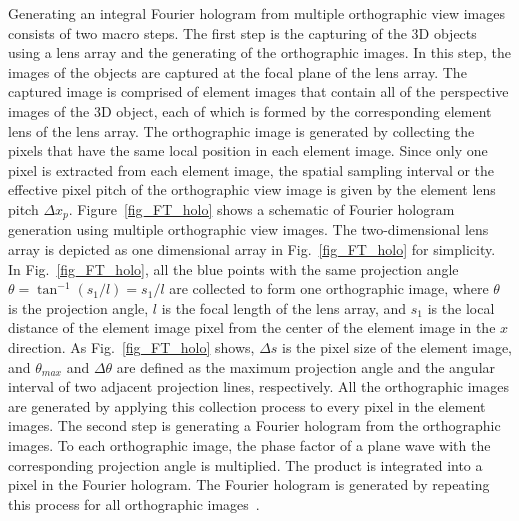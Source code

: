 \documentclass[10pt,letterpaper]{article}
\begin{document}
Generating an integral Fourier hologram from multiple orthographic view images consists of two macro steps. The first step is the capturing of the 3D objects using a lens array and the generating of the orthographic images. In this step, the images of the objects are captured at the focal plane of the lens array. The captured image is comprised of element images that contain all of the perspective images of the 3D object, each of which is formed by the corresponding element lens of the lens array. The orthographic image is generated by collecting the pixels that have the same local position in each element image. Since only one pixel is extracted from each element image, the spatial sampling interval or the effective pixel pitch of the orthographic view image is given by the element lens pitch $\Delta x_p$. Figure~\ref{fig_FT_holo} shows a schematic of Fourier hologram generation using multiple orthographic view images. The two-dimensional lens array is depicted as one dimensional array in Fig.~\ref{fig_FT_holo} for simplicity. In Fig.~\ref{fig_FT_holo}, all the blue points with the same projection angle $\theta=\tan^{-1}(s_1/l)=s_1/l$ are collected to form one orthographic image, where $\theta$ is the projection angle, $l$ is the focal length of the lens array, and $s_1$ is the local distance of the element image pixel from the center of the element image in the $x$ direction. As Fig.~\ref{fig_FT_holo} shows, $\Delta s$ is the pixel size of the element image, and $\theta_{max}$ and $\Delta \theta$ are defined as the maximum projection angle and the angular interval of two adjacent projection lines, respectively. All the orthographic images are generated by applying this collection process to every pixel in the element images. The second step is generating a Fourier hologram from the orthographic images. To each orthographic image, the phase factor of a plane wave with the corresponding projection angle is multiplied. The product is integrated into a pixel in the Fourier hologram. The Fourier hologram is generated by repeating this process for all orthographic images~\cite{Park_2009_OE}. 
\end{document}
